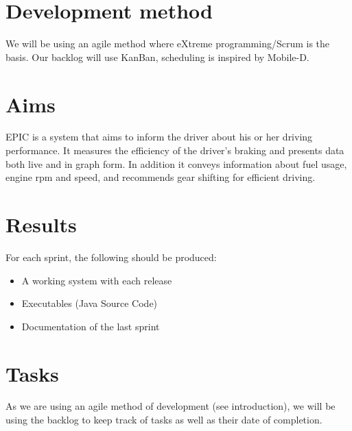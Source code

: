 \documentclass[a4paper,12pt]{article}
\begin{document}
\section{Development method}
We will be using an agile method where eXtreme programming/Scrum is the basis. Our backlog will use KanBan, scheduling is inspired by Mobile-D.

\section{Aims}
EPIC is a system that aims to inform the driver about his or her driving performance. It measures the efficiency of the driver’s braking and presents data both live and in graph form. In addition it conveys information about fuel usage, engine rpm and speed, and recommends gear shifting for efficient driving.

\section{Results}
For each sprint, the following should be produced:
\begin{itemize}
	\item A working system with each release
	\item Executables (Java Source Code)
	\item Documentation of the last sprint
\end{itemize}

\section{Tasks}
As we are using an agile method of development (see introduction), we will be using the backlog to keep track of tasks as well as their date of completion.
\end{document}
